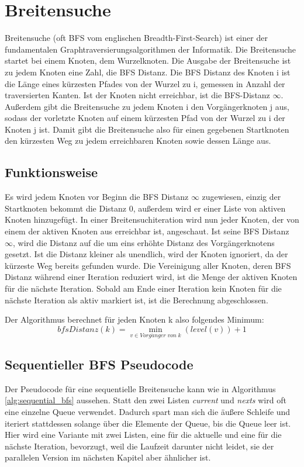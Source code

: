 
\section{Breitensuche} %
\label{sec:breitensuche}

Breitensuche (oft BFS vom englischen Breadth-First-Search) ist einer der fundamentalen Graphtraversierungsalgorithmen der Informatik. Die Breitensuche startet bei einem Knoten, dem Wurzelknoten. Die Ausgabe der Breitensuche ist zu jedem Knoten eine Zahl, die BFS Distanz. Die BFS Distanz des Knoten i ist die Länge eines kürzesten Pfades von der Wurzel zu i, gemessen in Anzahl der traversierten Kanten. Ist der Knoten nicht erreichbar, ist die BFS-Distanz $\infty$. Außerdem gibt die Breitensuche zu jedem Knoten i den Vorgängerknoten j aus, sodass der vorletzte Knoten auf einem kürzesten Pfad von der Wurzel zu i der Knoten j ist. Damit gibt die Breitensuche also für einen gegebenen Startknoten den kürzesten Weg zu jedem erreichbaren Knoten sowie dessen Länge aus.

\subsection{Funktionsweise} %
\label{sub:funktionsweise}
Es wird jedem Knoten vor Beginn die BFS Distanz $ \infty $ zugewiesen, einzig der Startknoten bekommt die Distanz 0, außerdem wird er einer Liste von aktiven Knoten hinzugefügt. In einer Breitensuchiteration wird nun jeder Knoten, der von einem der aktiven Knoten aus erreichbar ist, angeschaut. Ist seine BFS Distanz $ \infty $, wird die Distanz auf die um eins erhöhte Distanz des Vorgängerknotens gesetzt. Ist die Distanz kleiner als unendlich, wird der Knoten ignoriert, da der kürzeste Weg bereits gefunden wurde. Die Vereinigung aller Knoten, deren BFS Distanz während einer Iteration reduziert wird, ist die Menge der aktiven Knoten für die nächste Iteration. Sobald am Ende einer Iteration kein Knoten für die nächste Iteration als aktiv markiert ist, ist die Berechnung abgeschlossen. 

Der Algorithmus berechnet für jeden Knoten k also folgendes Minimum\cite{Hassaan:2010:OUA:1854273.1854341}:
$$
bfsDistanz(k) =  \min_{v \in Vorg\ddot{a}nger \; von \; k} (level(v))+1
$$


\subsection{Sequentieller BFS Pseudocode} %
\label{sub:sequentieller_bfs_pseudocode}
Der Pseudocode für eine sequentielle Breitensuche kann wie in Algorithmus \ref{alg:sequential_bfs} aussehen. Statt den zwei Listen \textit{current} und \textit{nexts} wird oft eine einzelne Queue verwendet. Dadurch spart man sich die äußere Schleife und iteriert stattdessen solange über die Elemente der Queue, bis die Queue leer ist. Hier wird eine Variante mit zwei Listen, eine für die aktuelle und eine für die nächste Iteration, bevorzugt, weil die Laufzeit darunter nicht leidet, sie der parallelen Version im nächsten Kapitel aber ähnlicher ist.

